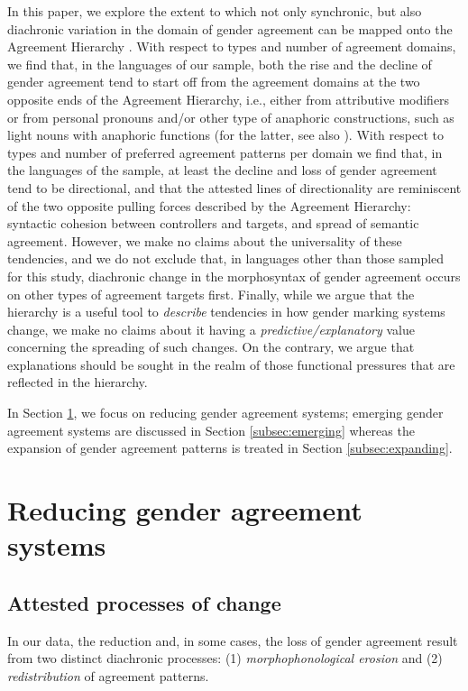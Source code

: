 \documentclass[output=collectionpaper]{langsci/langscibook}
\begin{document}
In this paper, we explore the extent to which not only synchronic, but also diachronic variation in the domain of gender agreement can be mapped onto the Agreement Hierarchy \citep[for an overview of the role of the Agreement Hierarchy in the diachrony of nominal classification see also][]{Seifart2010}.  With respect to types and number of agreement domains, we find that, in the languages of our sample, both the rise and the decline of gender agreement tend to start off from the agreement domains at the two opposite ends of the Agreement Hierarchy, i.e., either from attributive modifiers or from personal pronouns and/or other type of anaphoric constructions, such as light nouns with anaphoric functions (for the latter, see also ). With respect to types and number of preferred agreement patterns per domain we find that, in the languages of the sample, at least the decline and loss of gender agreement tend to be directional, and that the attested lines of directionality are reminiscent of the two opposite pulling forces described by the Agreement Hierarchy: syntactic cohesion between controllers and targets, and spread of semantic agreement. However, we make no claims about the universality of these tendencies, and we do not exclude that, in languages other than those sampled for this study, diachronic change in the morphosyntax of gender agreement occurs on other types of agreement targets first. Finally, while we argue that the hierarchy is a useful tool to \textit{describe} tendencies in how gender marking systems change, we make no claims about it having a \textit{predictive/explanatory} value concerning the spreading of such changes. On the contrary, we argue that explanations should be sought in the realm of those functional pressures that are reflected in the hierarchy.


In Section \ref{subsec:Reducing}, we focus on reducing gender agreement systems; emerging gender agreement systems are discussed in Section \ref{subsec:emerging} whereas the expansion of gender agreement patterns is treated in Section \ref{subsec:expanding}.


\section{Reducing gender agreement systems}
\label{subsec:Reducing}
\subsection{Attested processes of change}
In our data, the reduction and, in some cases, the loss of gender agreement result from two distinct diachronic processes: (1) \textit{morphophonological erosion} and (2) \textit{redistribution} of agreement patterns.
\end{document}
